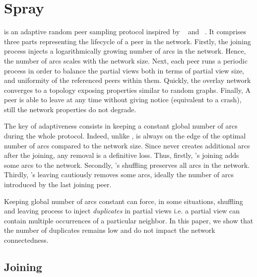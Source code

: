
\section{Spray}
\label{sec:proposal}

\SPRAY is an adaptive random peer sampling protocol inspired by
\SCAMP~\cite{ganesh2003peer} and \CYCLON~\cite{voulgaris2005cyclon}. It
comprises three parts representing the lifecycle of a peer in the network.
Firstly, the joining process injects a logarithmically growing number of arcs
in the network. Hence, the number of arcs scales with the network size.  Next,
each peer runs a periodic process in order to balance the partial views both in
terms of partial view size, and uniformity of the referenced peers within
them. Quickly, the overlay network converges to a topology exposing properties
similar to random graphs. Finally, A peer is able to leave at any time without
giving notice (equivalent to a crash), still the network properties do not
degrade.

The key of adaptiveness consists in keeping a constant global number of arcs
during the whole protocol. Indeed, unlike \CYCLON, \SPRAY is always on the edge
of the optimal number of arcs compared to the network size. Since \SPRAY never
creates additional arcs after the joining, any removal is a definitive
loss. Thus, firstly, \SPRAY's joining adds some arcs to the network. Secondly,
\SPRAY's shuffling preserves all arcs in the network. Thirdly, \SPRAY's leaving
cautiously removes some arcs, ideally the number of arcs introduced by the last
joining peer.

Keeping global number of arcs constant can force, in some situations,
shuffling and leaving process to inject \emph{duplicates} in partial
views i.e. a partial view can contain multiple occurrences of a
particular neighbor. In this paper, we show that the number of
duplicates remains low and do not impact the network connectedness.


\subsection{Joining}

